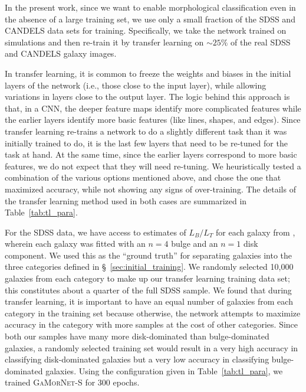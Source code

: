 \documentclass[twocolumn]{aastex63}
\newcommand\gamornet{G\textsc{a}M\textsc{or}N\textsc{et}}
\begin{document}
In the present work, since we want to enable morphological classification even in the absence of a large training set, we use only a small fraction of the SDSS and CANDELS data sets for training. Specifically, we take the network trained on simulations and then re-train it by transfer learning on $\sim25\%$ of the real SDSS and CANDELS galaxy images.

In transfer learning, it is common to freeze the weights and biases in the initial layers of the network (i.e., those close to the input layer), while allowing variations in layers close to the output layer. The logic behind this approach is that, in a CNN, the deeper feature maps identify more complicated features while the earlier layers identify more basic features (like lines, shapes, and edges). Since transfer learning re-trains a network to do a slightly different task than it was initially trained to do, it is the last few layers that need to be re-tuned for the task at hand. At the same time, since the earlier layers correspond to more basic features, we do not expect that they will need re-tuning. We heuristically tested a combination of the various options mentioned above, and chose the one that maximized accuracy, while not showing any signs of over-training. The details of the transfer learning method used in both cases are summarized in Table~\ref{tab:tl_para}.

For the SDSS data, we have access to estimates of $L_B/L_T$ for each galaxy from \citet{simard_11}, wherein each galaxy was fitted with an $n=4$ bulge and an $n=1$ disk component. We used this as the ``ground truth'' for separating galaxies into the three categories defined in \S~\ref{sec:initial_training}. We randomly selected 10,000 galaxies from each category to make up our transfer learning training data set; this constitutes about a quarter of the full SDSS sample. We found that during transfer learning, it is important to have an equal number of galaxies from each category in the training set because otherwise, the network attempts to maximize accuracy in the category with more samples at the cost of other categories. Since both our samples have many more disk-dominated than bulge-dominated galaxies, a randomly selected training set would result in a very high accuracy in classifying disk-dominated galaxies but a very low accuracy in classifying bulge-dominated galaxies. Using the configuration given in Table~\ref{tab:tl_para}, we trained \gamornet{}-S for 300 epochs.
\end{document}
